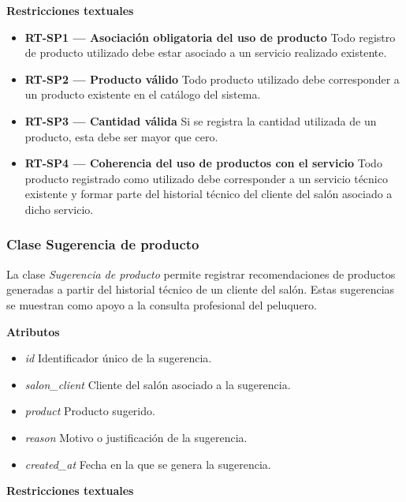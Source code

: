 \textbf{Restricciones textuales}

\begin{itemize}

      \item \textbf{RT-SP1 — Asociación obligatoria del uso de producto}
            Todo registro de producto utilizado debe estar asociado a un servicio realizado existente.
      \item \textbf{RT-SP2 — Producto válido}
            Todo producto utilizado debe corresponder a un producto existente en el catálogo del sistema.
      \item \textbf{RT-SP3 — Cantidad válida}
            Si se registra la cantidad utilizada de un producto, esta debe ser mayor que cero.
      \item \textbf{RT-SP4 — Coherencia del uso de productos con el servicio}
            Todo producto registrado como utilizado debe corresponder a un servicio técnico existente y formar parte del historial técnico del cliente del salón asociado a dicho servicio.
\end{itemize}

\subsubsection{Clase Sugerencia de producto}

La clase \textit{Sugerencia de producto} permite registrar recomendaciones de productos generadas a partir del historial técnico de un cliente del salón. Estas sugerencias se muestran como apoyo a la consulta profesional del peluquero.

\textbf{Atributos}

\begin{itemize}

      \item \textit{id}
            Identificador único de la sugerencia.
      \item \textit{salon\_client}
            Cliente del salón asociado a la sugerencia.
      \item \textit{product}
            Producto sugerido.
      \item \textit{reason}
            Motivo o justificación de la sugerencia.
      \item \textit{created\_at}
            Fecha en la que se genera la sugerencia.

\end{itemize}

\textbf{Restricciones textuales}

